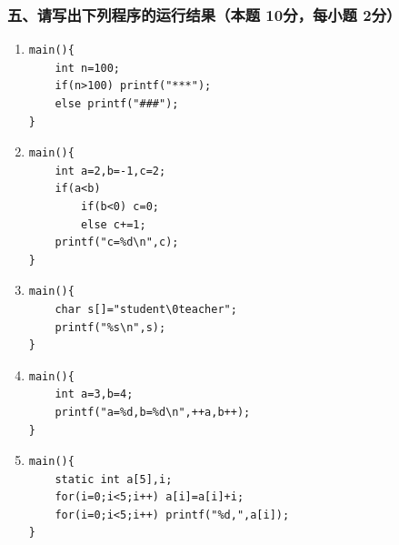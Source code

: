 \documentclass[12pt,a4paper]{article}
\begin{document}
\subsubsection*{五、请写出下列程序的运行结果（本题 10分，每小题 2分）}
\begin{enumerate}
    \item 
    \begin{verbatim}
main(){
    int n=100;
    if(n>100) printf("***");
    else printf("###");
}
    \end{verbatim}
    
    \item 
    \begin{verbatim}
main(){
    int a=2,b=-1,c=2;
    if(a<b)
        if(b<0) c=0;
        else c+=1;
    printf("c=%d\n",c);
}
    \end{verbatim}
    
    \item 
    \begin{verbatim}
main(){
    char s[]="student\0teacher";
    printf("%s\n",s);
}
    \end{verbatim}
    
    \item 
    \begin{verbatim}
main(){
    int a=3,b=4;
    printf("a=%d,b=%d\n",++a,b++);
}
    \end{verbatim}
    
    \item 
    \begin{verbatim}
main(){
    static int a[5],i;
    for(i=0;i<5;i++) a[i]=a[i]+i;
    for(i=0;i<5;i++) printf("%d,",a[i]);
}
    \end{verbatim}
\end{enumerate}
\end{document}
